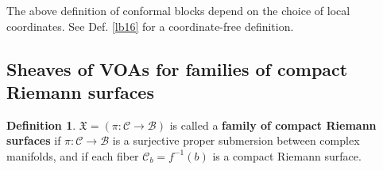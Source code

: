 \documentclass[11pt,b5paper,notitlepage]{article}
\theoremstyle{definition}
\newtheorem{df}{Definition}[subsection]
\newtheorem{rem}[df]{Remark}
\theoremstyle{plain}
\newcommand{\Vbb}{\mathbb V}
\newcommand{\Wbb}{\mathbb W}
\newcommand{\<}{\left\langle}
\renewcommand{\>}{\right\rangle}
\newcommand{\MC}{\mathcal{C}}
\newcommand{\MB}{\mathcal{B}}
\newcommand{\fx}{\mathfrak{X}}
\numberwithin{equation}{subsection}
\begin{document}
The above definition of conformal blocks depend on the choice of local coordinates. See Def. \ref{lb16} for a coordinate-free definition.





\begin{comment}
\begin{rem}\label{conformaldefweak}
    Note that the above definition also makes sense when $\Wbb$ is a weak $\Vbb^{\times N}$-module. This is because we have chosen local coordinates at each marked point and we do not need to consider change of coordinate operators with respect to $\Wbb$.
\end{rem}
\end{comment}





\subsection{Sheaves of VOAs for families of compact Riemann surfaces}
\begin{df}
    $\fx=(\pi:\MC\rightarrow \MB)$ is called a \textbf{family of compact Riemann surfaces} if $\pi:\MC\rightarrow \MB$ is a surjective proper submersion between complex manifolds, and if each fiber $\MC_b=f^{-1}(b)$ is a compact Riemann surface.
\end{df}
\end{document}
